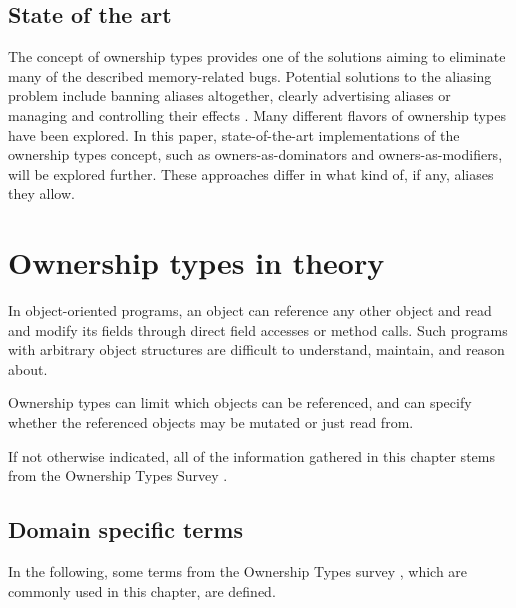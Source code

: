 \documentclass[sigplan,11pt,nonacm]{acmart}
\begin{document}
\subsection{State of the art}
\label{sec:state-of-the-art}

The concept of ownership types provides one of the solutions aiming to eliminate many of the described memory-related bugs.
Potential solutions to the aliasing problem include banning aliases altogether, clearly advertising aliases or managing and controlling their effects \cite{ownership-types-survey}.
Many different flavors of ownership types have been explored.
In this paper, state-of-the-art implementations of the ownership types concept, such as owners-as-dominators and owners-as-modifiers, will be explored further.
These approaches differ in what kind of, if any, aliases they allow.



\section{Ownership types in theory}
\label{sec:theory}

In object-oriented programs, an object can reference any other object and read and modify its fields through direct field accesses or method calls.
Such programs with arbitrary object structures are difficult to understand, maintain, and reason about. \cite{lightweight-ownership}

Ownership types can limit which objects can be referenced, and can specify whether the referenced objects may be mutated or just read from.

If not otherwise indicated, all of the information gathered in this chapter stems from the Ownership Types Survey \cite{ownership-types-survey}.


\subsection{Domain specific terms}
\label{sec:domain-specific-terms}

In the following, some terms from the Ownership Types survey \cite{ownership-types-survey}, which are commonly used in this chapter, are defined.
\end{document}
